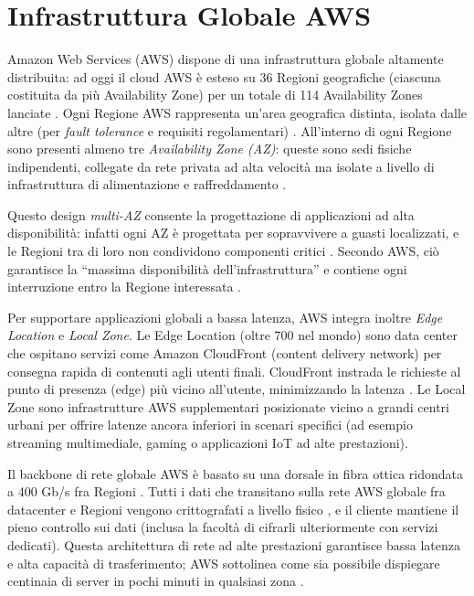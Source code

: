 \documentclass[a4paper,12pt]{report}
\begin{document}
\section{Infrastruttura Globale AWS}
Amazon Web Services (AWS) dispone di una infrastruttura globale altamente distribuita: ad oggi il cloud AWS è esteso su 36 Regioni geografiche (ciascuna costituita da più Availability Zone) per un totale di 114 Availability Zones lanciate \cite{aws-global-infra}. Ogni Regione AWS rappresenta un’area geografica distinta, isolata dalle altre (per \textit{fault tolerance} e requisiti regolamentari) \cite{aws-global-infra}. All’interno di ogni Regione sono presenti almeno tre \textit{Availability Zone (AZ)}: queste sono sedi fisiche indipendenti, collegate da rete privata ad alta velocità ma isolate a livello di infrastruttura di alimentazione e raffreddamento \cite{aws-global-infra}.

Questo design \textit{multi-AZ} consente la progettazione di applicazioni ad alta disponibilità: infatti ogni AZ è progettata per sopravvivere a guasti localizzati, e le Regioni tra di loro non condividono componenti critici \cite{aws-global-infra}. Secondo AWS, ciò garantisce la “massima disponibilità dell’infrastruttura” e contiene ogni interruzione entro la Regione interessata \cite{aws-global-infra}.

Per supportare applicazioni globali a bassa latenza, AWS integra inoltre \textit{Edge Location} e \textit{Local Zone}. Le Edge Location (oltre 700 nel mondo) sono data center che ospitano servizi come Amazon CloudFront (content delivery network) per consegna rapida di contenuti agli utenti finali. CloudFront instrada le richieste al punto di presenza (edge) più vicino all’utente, minimizzando la latenza \cite{aws-cloudfront}. Le Local Zone sono infrastrutture AWS supplementari posizionate vicino a grandi centri urbani per offrire latenze ancora inferiori in scenari specifici (ad esempio streaming multimediale, gaming o applicazioni IoT ad alte prestazioni).

Il backbone di rete globale AWS è basato su una dorsale in fibra ottica ridondata a 400 Gb/s fra Regioni \cite{aws-network}. Tutti i dati che transitano sulla rete AWS globale fra datacenter e Regioni vengono crittografati a livello fisico \cite{aws-network}, e il cliente mantiene il pieno controllo sui dati (inclusa la facoltà di cifrarli ulteriormente con servizi dedicati). Questa architettura di rete ad alte prestazioni garantisce bassa latenza e alta capacità di trasferimento; AWS sottolinea come sia possibile dispiegare centinaia di server in pochi minuti in qualsiasi zona \cite{aws-network}.
\end{document}

